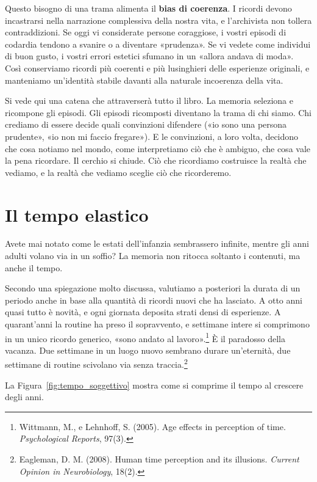 Questo bisogno di una trama alimenta il \textbf{bias di coerenza}. I ricordi devono incastrarsi nella narrazione complessiva della nostra vita, e l'archivista non tollera contraddizioni. Se oggi vi considerate persone coraggiose, i vostri episodi di codardia tendono a svanire o a diventare «prudenza». Se vi vedete come individui di buon gusto, i vostri errori estetici sfumano in un «allora andava di moda». Così conserviamo ricordi più coerenti e più lusinghieri delle esperienze originali, e manteniamo un'identità stabile davanti alla naturale incoerenza della vita.

Si vede qui una catena che attraverserà tutto il libro. La memoria seleziona e ricompone gli episodi. Gli episodi ricomposti diventano la trama di chi siamo. Chi crediamo di essere decide quali convinzioni difendere («io sono una persona prudente», «io non mi faccio fregare»). E le convinzioni, a loro volta, decidono che cosa notiamo nel mondo, come interpretiamo ciò che è ambiguo, che cosa vale la pena ricordare. Il cerchio si chiude. Ciò che ricordiamo costruisce la realtà che vediamo, e la realtà che vediamo sceglie ciò che ricorderemo.

\section{Il tempo elastico}

Avete mai notato come le estati dell'infanzia sembrassero infinite, mentre gli anni adulti volano via in un soffio? La memoria non ritocca soltanto i contenuti, ma anche il tempo.

Secondo una spiegazione molto discussa, valutiamo a posteriori la durata di un periodo anche in base alla quantità di ricordi nuovi che ha lasciato. A otto anni quasi tutto è novità, e ogni giornata deposita strati densi di esperienze. A quarant'anni la routine ha preso il sopravvento, e settimane intere si comprimono in un unico ricordo generico, «sono andato al lavoro».\footnote{Wittmann, M., e Lehnhoff, S. (2005). Age effects in perception of time. \textit{Psychological Reports}, 97(3).} È il paradosso della vacanza. Due settimane in un luogo nuovo sembrano durare un'eternità, due settimane di routine scivolano via senza traccia.\footnote{Eagleman, D. M. (2008). Human time perception and its illusions. \textit{Current Opinion in Neurobiology}, 18(2).}

La Figura~\ref{fig:tempo_soggettivo} mostra come si comprime il tempo al crescere degli anni.


